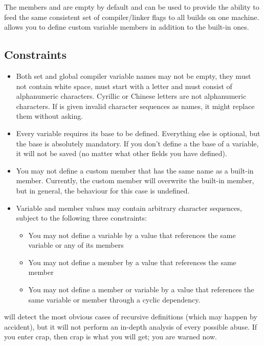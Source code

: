 The members  and  are empty by default and can be used to provide the ability to feed the same consistent set of compiler/linker flags to all builds on one machine. \codeblocks allows you to define custom variable members in addition to the built-in ones.

\subsection{Constraints}

\begin{itemize}
\item Both set and global compiler variable names may not be empty, they must not contain white space, must start with a letter and must consist of alphanumeric characters. Cyrillic or Chinese letters are not alphanumeric characters. If \codeblocks is given invalid character sequences as names, it might replace them without asking.
\item Every variable requires its base to be defined. Everything else is optional, but the base is absolutely mandatory. If you don't define a the base of a variable, it will not be saved (no matter what other fields you have defined).
\item You may not define a custom member that has the same name as a built-in member. Currently, the custom member will overwrite the built-in member, but in general, the behaviour for this case is undefined.
\item Variable and member values may contain arbitrary character sequences, subject to the following three constraints:
\begin{itemize}
\item You may not define a variable by a value that references the same variable or any of its members
\item You may not define a member by a value that references the same member
\item You may not define a member or variable by a value that references the same variable or member through a cyclic dependency.
\end{itemize}
\end{itemize}

\codeblocks will detect the most obvious cases of recursive definitions (which may happen by accident), but it will not perform an in-depth analysis of every possible abuse. If you enter crap, then crap is what you will get; you are warned now.

